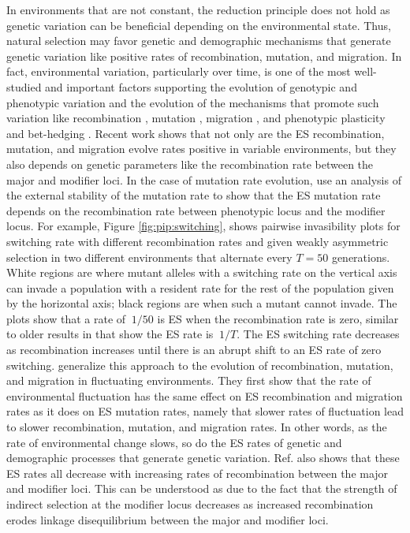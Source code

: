 \documentclass[11pt]{article}
\begin{document}
In environments that are not constant, the reduction principle does not hold as genetic variation can be beneficial depending on the environmental state. Thus, natural selection may favor genetic and demographic mechanisms that generate genetic variation like positive rates of recombination, mutation, and migration. In fact, environmental variation, particularly over time, is one of the most well-studied and important factors supporting the evolution of genotypic and phenotypic variation and the evolution of the mechanisms that promote such variation like recombination \cite{Charlesworth:1976,Sasaki:Iwasa:1987,Otto:Michalakis:1998}, mutation \cite{Leigh:1970,Ishii:Matsuda:1989,Lachmann:Jablonka:1996}, migration \cite{Gillespie:1981,McPeek:Holt:1992,Blanquart:Gandon:2011}, and phenotypic plasticity \cite{Caswell:1983,Via:Lande:1985,Gavrilets:Scheiner:1993,Jong:1995} and bet-hedging \cite{Slatkin:1974,Seger:Brockmann:1987,Kussell:Leibler:2005,Salathe:VanCleve:2009}. Recent work shows that not only are the ES recombination, mutation, and migration evolve rates positive in variable environments, but they also depends on genetic parameters like the recombination rate between the major and modifier loci. In the case of mutation rate evolution, \citeauthor{Liberman:VanCleve:2011} \cite{Liberman:VanCleve:2011} use an analysis of the external stability of the mutation rate to show that the ES mutation rate depends on the recombination rate between phenotypic locus and the modifier locus. For example, Figure \ref{fig:pip:switching}, shows pairwise invasibility plots for switching rate with different recombination rates and given weakly asymmetric selection in two different environments that alternate every $T=50$ generations. White regions are where mutant alleles with a switching rate on the vertical axis can invade a population with a resident rate for the rest of the population given by the horizontal axis; black regions are when such a mutant cannot invade. The plots show that a rate of $~1/50$ is ES when the recombination rate is zero, similar to older results in \cite{Leigh:1970,Lachmann:Jablonka:1996} that show the ES rate is $~1/T$. The ES switching rate decreases as recombination increases until there is an abrupt shift to an ES rate of zero switching. \citeauthor{Carja:Liberman:2014} \cite{Carja:Liberman:2014} generalize this approach to the evolution of recombination, mutation, and migration in fluctuating environments. They first show that the rate of environmental fluctuation has the same effect on ES recombination and migration rates as it does on ES mutation rates, namely that slower rates of fluctuation lead to slower recombination, mutation, and migration rates. In other words, as the rate of environmental change slows, so do the ES rates of genetic and demographic processes that generate genetic variation. Ref. \cite{Carja:Liberman:2014} also shows that these ES rates all decrease with increasing rates of recombination between the major and modifier loci. This can be understood as due to the fact that the strength of indirect selection at the modifier locus decreases as increased recombination erodes linkage disequilibrium between the major and modifier loci.
\end{document}
